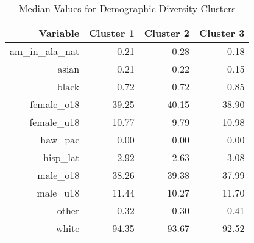 \begin{table}[ht]
    \centering
    \caption{Median Values for Demographic Diversity Clusters}
    \label{tab:dem}
    \begin{tabular}{|r|r|r|r|}
      \hline
     Variable & Cluster 1 & Cluster 2 & Cluster 3 \\ 
      \hline
    am\_in\_ala\_nat & 0.21 & 0.28 & 0.18 \\ 
    \hline
      asian & 0.21 & 0.22 & 0.15 \\ 
      \hline
      black & 0.72 & 0.72 & 0.85 \\ 
      \hline
      female\_o18 & 39.25 & 40.15 & 38.90 \\ 
      \hline
      female\_u18 & 10.77 & 9.79 & 10.98 \\ 
      \hline
      haw\_pac & 0.00 & 0.00 & 0.00 \\ 
      \hline
      hisp\_lat & 2.92 & 2.63 & 3.08 \\ 
      \hline
      male\_o18 & 38.26 & 39.38 & 37.99 \\ 
      \hline
      male\_u18 & 11.44 & 10.27 & 11.70 \\ 
      \hline
      other & 0.32 & 0.30 & 0.41 \\ 
      \hline
      white & 94.35 & 93.67 & 92.52 \\ 
       \hline
    \end{tabular}
    \end{table}